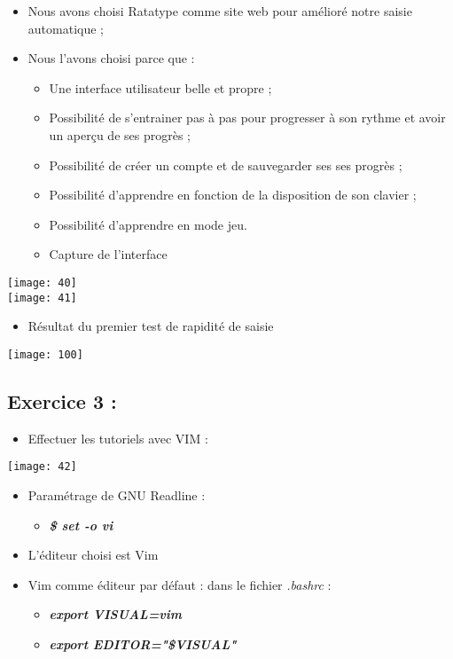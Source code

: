 \documentclass[a4paper]{article}
\begin{document}
\begin{itemize}
    \item Nous avons choisi Ratatype comme site web pour amélioré notre saisie automatique ;
    \item Nous l'avons choisi parce que : 
    \begin{itemize}
        \item Une interface utilisateur belle et propre ;
        \item Possibilité de s'entrainer pas à pas pour progresser à son rythme et avoir un aperçu de ses progrès ;
        \item Possibilité de créer un compte et de sauvegarder ses ses progrès ;
        \item Possibilité d'apprendre en fonction de la disposition de son clavier ;
        \item Possibilité d'apprendre en mode jeu. 
        \item Capture de l'interface
    \end{itemize}
    
\end{itemize}


	\texttt{[image: 40]} \\
	\hfill \break
	\hfill \break
	\texttt{[image: 41]}
 \begin{itemize}
 	\item Résultat du premier test de rapidité de saisie  
 \end{itemize}
\texttt{[image: 100]}

\subsection{Exercice 3 :}
	\begin{itemize}
		\item Effectuer les tutoriels avec VIM :
	\end{itemize}
	\begin{center}
		\texttt{[image: 42]}
	\end{center}
	\begin{itemize}
		\item Paramétrage de GNU Readline :
			\begin{itemize}
				\item \textit{\textbf{\$ set -o vi}}
			\end{itemize}
		\item L'éditeur choisi est Vim
		\item  Vim comme éditeur par défaut : dans le fichier \textit{.bashrc} : 
			\begin{itemize}
			\item \textit{\textbf{export VISUAL=vim}}
			\item \textit{\textbf{export EDITOR="\$VISUAL"}}
		\end{itemize}
	\end{itemize}
	
\end{document}

